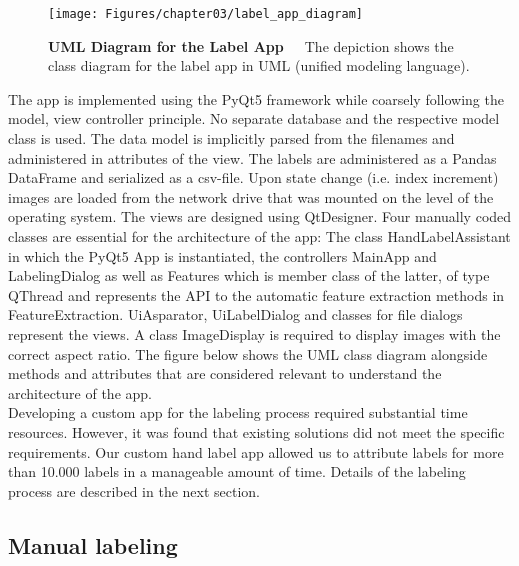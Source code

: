 \begin{figure}[h]
	\centering
	\texttt{[image: Figures/chapter03/label\_app\_diagram]}
	\decoRule
	\caption[UML Diagram for the Label App]{\textbf{UML Diagram for the Label App}~~~The depiction shows the class diagram for the label app in UML (unified modeling language).}
	\label{fig:LabelAppDiagram}
\end{figure}

The app is implemented using the PyQt5 framework while coarsely following the model, view controller principle. No separate database and the respective model class is used. The data model is implicitly parsed from the filenames and administered in attributes of the view. The labels are administered as a Pandas DataFrame and serialized as a csv-file. Upon state change (i.e. index increment) images are loaded from the network drive that was mounted on the level of the operating system. The views are designed using QtDesigner. Four manually coded classes are essential for the architecture of the app: The class HandLabelAssistant in which the PyQt5 App is instantiated, the controllers MainApp and LabelingDialog as well as Features which is member class of the latter, of type QThread and represents the API to the automatic feature extraction methods in FeatureExtraction. Ui\textunderscore Asparator, UiLabelDialog and classes for file dialogs represent the views. A class ImageDisplay is required to display images with the correct aspect ratio. The figure below shows the UML class diagram alongside methods and attributes that are considered relevant to understand the architecture of the app. \\
Developing a custom app for the labeling process required substantial time resources. However, it was found that existing solutions did not meet the specific requirements. Our custom hand label app allowed us to attribute labels for more than 10.000 labels in a manageable amount of time. Details of the labeling process are described in the next section.

\subsection{Manual labeling}
\label{sec:ManualLabeling}

